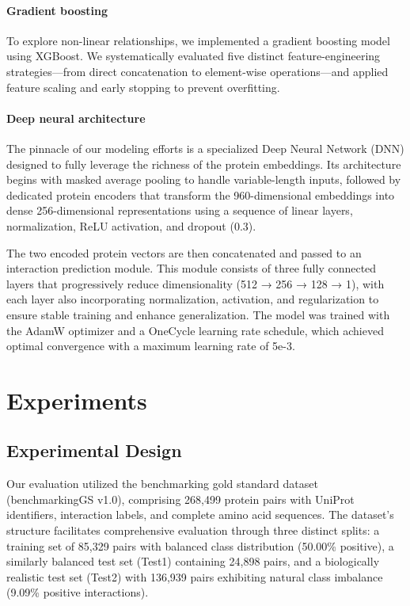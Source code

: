 \documentclass{article}
\begin{document}
	\paragraph{Gradient boosting} To explore non-linear relationships, we implemented a gradient boosting model using XGBoost. We systematically evaluated five distinct feature-engineering strategies—from direct concatenation to element-wise operations—and applied feature scaling and early stopping to prevent overfitting.

	\paragraph{Deep neural architecture} The pinnacle of our modeling efforts is a specialized Deep Neural Network (DNN) designed to fully leverage the richness of the protein embeddings. Its architecture begins with masked average pooling to handle variable-length inputs, followed by dedicated protein encoders that transform the 960-dimensional embeddings into dense 256-dimensional representations using a sequence of linear layers, normalization, ReLU activation, and dropout (0.3).
	
	The two encoded protein vectors are then concatenated and passed to an interaction prediction module. This module consists of three fully connected layers that progressively reduce dimensionality (512 → 256 → 128 → 1), with each layer also incorporating normalization, activation, and regularization to ensure stable training and enhance generalization. The model was trained with the AdamW optimizer and a OneCycle learning rate schedule, which achieved optimal convergence with a maximum learning rate of 5e-3.
	
	\section{Experiments}
    
	\subsection{Experimental Design}

	Our evaluation utilized the benchmarking gold standard dataset (benchmarkingGS v1.0), comprising 268,499 protein pairs with UniProt identifiers, interaction labels, and complete amino acid sequences. The dataset's structure facilitates comprehensive evaluation through three distinct splits: a training set of 85,329 pairs with balanced class distribution (50.00\% positive), a similarly balanced test set (Test1) containing 24,898 pairs, and a biologically realistic test set (Test2) with 136,939 pairs exhibiting natural class imbalance (9.09\% positive interactions).
\end{document}
